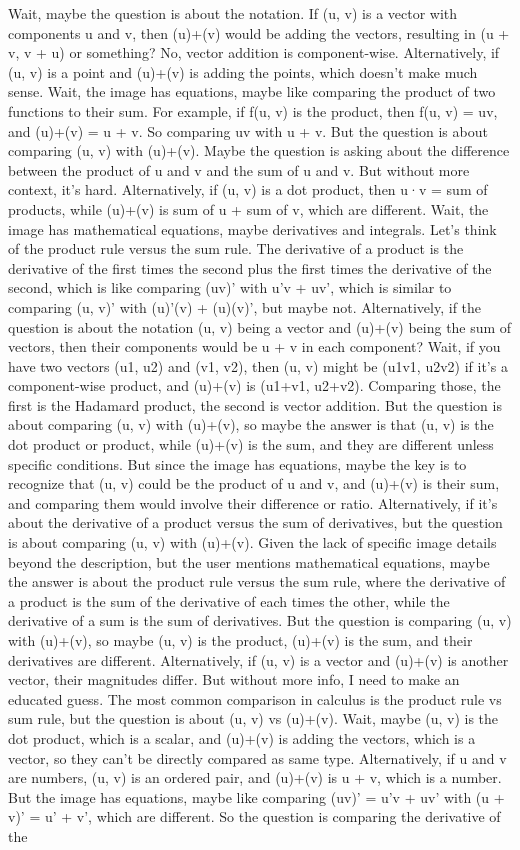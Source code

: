 Wait, maybe the question is about the notation. If (u, v) is a vector with components u and v, then (u)+(v) would be adding the vectors, resulting in (u + v, v + u) or something? No, vector addition is component-wise. Alternatively, if (u, v) is a point and (u)+(v) is adding the points, which doesn't make much sense. Wait, the image has equations, maybe like comparing the product of two functions to their sum. For example, if f(u, v) is the product, then f(u, v) = uv, and (u)+(v) = u + v. So comparing uv with u + v. But the question is about comparing (u, v) with (u)+(v). Maybe the question is asking about the difference between the product of u and v and the sum of u and v. But without more context, it's hard. Alternatively, if (u, v) is a dot product, then u·v = sum of products, while (u)+(v) is sum of u + sum of v, which are different. Wait, the image has mathematical equations, maybe derivatives and integrals. Let's think of the product rule versus the sum rule. The derivative of a product is the derivative of the first times the second plus the first times the derivative of the second, which is like comparing (uv)' with u'v + uv', which is similar to comparing (u, v)' with (u)'(v) + (u)(v)', but maybe not. Alternatively, if the question is about the notation (u, v) being a vector and (u)+(v) being the sum of vectors, then their components would be u + v in each component? Wait, if you have two vectors (u1, u2) and (v1, v2), then (u, v) might be (u1v1, u2v2) if it's a component-wise product, and (u)+(v) is (u1+v1, u2+v2). Comparing those, the first is the Hadamard product, the second is vector addition. But the question is about comparing (u, v) with (u)+(v), so maybe the answer is that (u, v) is the dot product or product, while (u)+(v) is the sum, and they are different unless specific conditions. But since the image has equations, maybe the key is to recognize that (u, v) could be the product of u and v, and (u)+(v) is their sum, and comparing them would involve their difference or ratio. Alternatively, if it's about the derivative of a product versus the sum of derivatives, but the question is about comparing (u, v) with (u)+(v). Given the lack of specific image details beyond the description, but the user mentions mathematical equations, maybe the answer is about the product rule versus the sum rule, where the derivative of a product is the sum of the derivative of each times the other, while the derivative of a sum is the sum of derivatives. But the question is comparing (u, v) with (u)+(v), so maybe (u, v) is the product, (u)+(v) is the sum, and their derivatives are different. Alternatively, if (u, v) is a vector and (u)+(v) is another vector, their magnitudes differ. But without more info, I need to make an educated guess. The most common comparison in calculus is the product rule vs sum rule, but the question is about (u, v) vs (u)+(v). Wait, maybe (u, v) is the dot product, which is a scalar, and (u)+(v) is adding the vectors, which is a vector, so they can't be directly compared as same type. Alternatively, if u and v are numbers, (u, v) is an ordered pair, and (u)+(v) is u + v, which is a number. But the image has equations, maybe like comparing (uv)' = u'v + uv' with (u + v)' = u' + v', which are different. So the question is comparing the derivative of the 